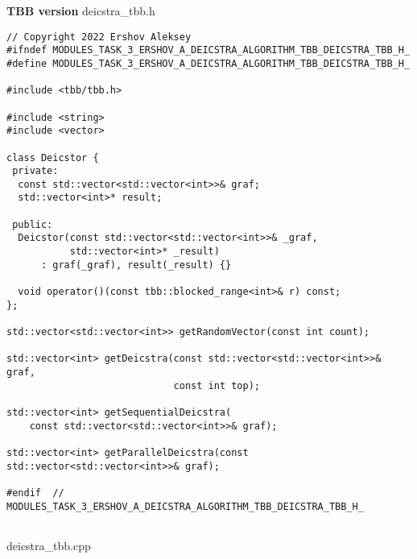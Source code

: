 \documentclass{report}
\begin{document}
\textbf{TBB version}
\newline
\newline deicstra\_tbb.h
\begin{lstlisting}
// Copyright 2022 Ershov Aleksey
#ifndef MODULES_TASK_3_ERSHOV_A_DEICSTRA_ALGORITHM_TBB_DEICSTRA_TBB_H_
#define MODULES_TASK_3_ERSHOV_A_DEICSTRA_ALGORITHM_TBB_DEICSTRA_TBB_H_

#include <tbb/tbb.h>

#include <string>
#include <vector>

class Deicstor {
 private:
  const std::vector<std::vector<int>>& graf;
  std::vector<int>* result;

 public:
  Deicstor(const std::vector<std::vector<int>>& _graf,
           std::vector<int>* _result)
      : graf(_graf), result(_result) {}

  void operator()(const tbb::blocked_range<int>& r) const;
};

std::vector<std::vector<int>> getRandomVector(const int count);

std::vector<int> getDeicstra(const std::vector<std::vector<int>>& graf,
                             const int top);

std::vector<int> getSequentialDeicstra(
    const std::vector<std::vector<int>>& graf);

std::vector<int> getParallelDeicstra(const std::vector<std::vector<int>>& graf);

#endif  // MODULES_TASK_3_ERSHOV_A_DEICSTRA_ALGORITHM_TBB_DEICSTRA_TBB_H_


\end{lstlisting}
deicstra\_tbb.cpp
\end{document}
